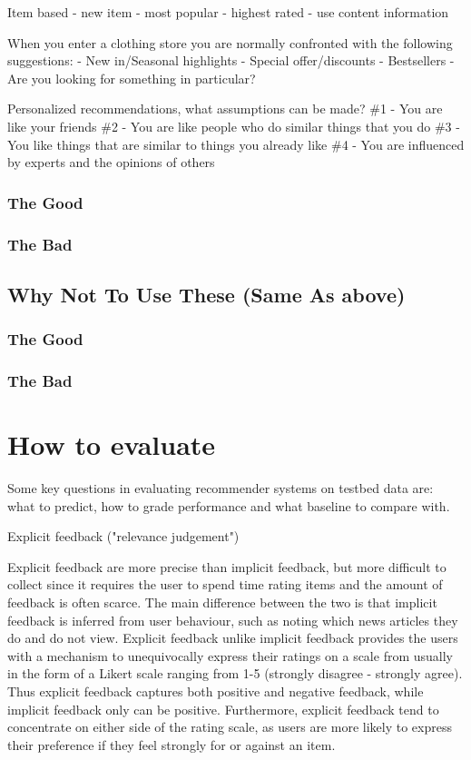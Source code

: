 Item based - new item
	- most popular
	- highest rated
	- use content information

When you enter a clothing store you are normally confronted with the following suggestions:
	- New in/Seasonal highlights
	- Special offer/discounts
	- Bestsellers
	- Are you looking for something in particular?

Personalized recommendations, what assumptions can be made?
\#1 - You are like your friends
\#2 - You are like people who do similar things that you do
\#3 - You like things that are similar to things you already like
\#4 - You are influenced by experts and the opinions of others

\subsubsection{The Good}
\subsubsection{The Bad}
\subsection{Why Not To Use These (Same As above)}
\subsubsection{The Good}
\subsubsection{The Bad}

\section{How to evaluate}


Some key questions in evaluating recommender systems on testbed data are: what to predict, how to grade performance and what baseline to compare with.


Explicit feedback ("relevance judgement")

Explicit feedback are more precise than implicit feedback, but more difficult
to collect since it requires the user to spend time rating items and the amount
of feedback is often scarce. The main difference between the two is that
implicit feedback is inferred from user behaviour, such as noting which news
articles they do and do not view. Explicit feedback unlike implicit feedback
provides the users with a mechanism to unequivocally express their ratings on a
scale from usually in the form of a Likert scale ranging from 1-5 (strongly
disagree - strongly agree). Thus explicit feedback captures both positive and
negative feedback, while implicit feedback only can be positive. Furthermore,
explicit feedback tend to concentrate on either side of the rating scale, as
users are more likely to express their preference if they feel strongly for or
against an item.

